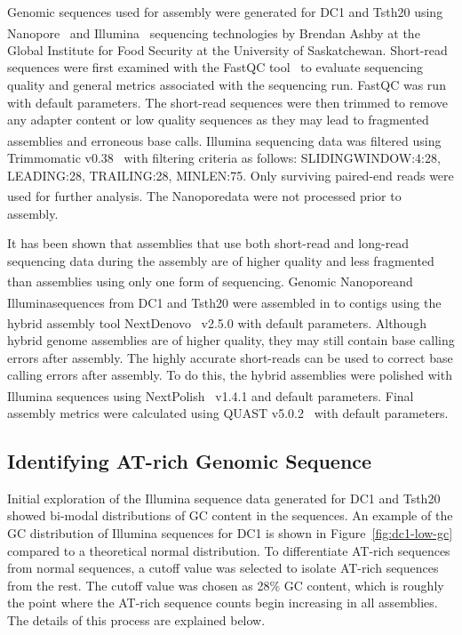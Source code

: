 Genomic sequences used for assembly were generated for DC1 and Tsth20
using
Nanopore\textsuperscript{\textcopyright}\texttrademark~\cite{wang2021a}
and
Illumina\textsuperscript{\textcopyright}\texttrademark~\cite{bennett2004a}
sequencing technologies by Brendan Ashby at the Global Institute for
Food Security at the University of Saskatchewan. Short-read sequences
were first examined with the FastQC tool~\cite{andrews} to evaluate
sequencing quality and general metrics associated with the sequencing
run. FastQC was run with default parameters. The short-read sequences
were then trimmed to remove any adapter content or low quality
sequences as they may lead to fragmented assemblies and erroneous base
calls.  Illumina\textsuperscript{\textcopyright}\texttrademark
sequencing data was filtered using Trimmomatic v0.38~\cite{bolger2014a}
with filtering criteria as follows: SLIDINGWINDOW:4:28, LEADING:28,
TRAILING:28, MINLEN:75. Only surviving paired-end reads were used for
further analysis. The
Nanopore\textsuperscript{\textcopyright}\texttrademark data were not
processed prior to assembly.

It has been shown that assemblies that use both short-read and
long-read sequencing data during the assembly are of higher quality
and less fragmented than assemblies using only one form of
sequencing. Genomic
Nanopore\textsuperscript{\textcopyright}\texttrademark and
Illumina\textsuperscript{\textcopyright}\texttrademark sequences from
DC1 and Tsth20 were assembled in to contigs using the hybrid assembly
tool
NextDenovo\textsuperscript{\textcopyright}\texttrademark~\cite{hu2024a}
v2.5.0 with default parameters. Although hybrid genome assemblies are
of higher quality, they may still contain base calling errors after
assembly. The highly accurate short-reads can be used to correct base
calling errors after assembly. To do this, the hybrid assemblies were
polished with Illumina\textsuperscript{\textcopyright}\texttrademark
sequences using NextPolish~\cite{hu2020a} v1.4.1 and default
parameters. Final assembly metrics were calculated using QUAST
v5.0.2~\cite{gurevich2013a} with default parameters.

\subsection{Identifying AT-rich Genomic Sequence}
\label{met:atrich}
Initial exploration of the Illumina sequence data generated for DC1
and Tsth20 showed bi-modal distributions of GC content in the
sequences. An example of the GC distribution of Illumina sequences for
DC1 is shown in Figure~\ref{fig:dc1-low-gc} compared to a theoretical
normal distribution. To differentiate AT-rich sequences from normal
sequences, a cutoff value was selected to isolate AT-rich sequences
from the rest. The cutoff value was chosen as 28\% GC content, which
is roughly the point where the AT-rich sequence counts begin
increasing in all assemblies. The details of this process are
explained below.

